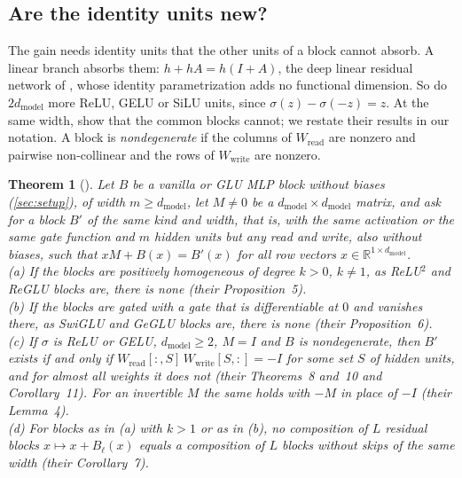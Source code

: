\documentclass[10pt]{article}
\newtheorem{theorem}{Theorem}
\theoremstyle{definition}
\theoremstyle{remark}
\newcommand{\R}{\mathbb{R}}
\newcommand{\Wread}{W_{\mathrm{read}}}
\newcommand{\Wwrite}{W_{\mathrm{write}}}
\newcommand{\dm}{d_{\mathrm{model}}}
\begin{document}
\subsection{Are the identity units new?}\label{sec:oneblock}

The gain needs identity units that the other units of a block cannot absorb. A linear branch absorbs them: $h + hA = h(I + A)$, the deep linear residual network of \citet{hardt2017identity}, whose identity parametrization adds no functional dimension. So do $2\dm$ more ReLU, GELU or SiLU units, since $\sigma(z) - \sigma(-z) = z$. At the same width, \citet{mijoski2026absorb} show that the common blocks cannot; we restate their results in our notation. A block is \emph{nondegenerate} if the columns of $\Wread$ are nonzero and pairwise non-collinear and the rows of $\Wwrite$ are nonzero.

\begin{theorem}[{\citealp{mijoski2026absorb}}]\label{thm:noabsorb}
Let $B$ be a vanilla or GLU MLP block without biases (\cref{sec:setup}), of width $m \ge \dm$, let $M \neq 0$ be a $\dm \times \dm$ matrix, and ask for a block $B'$ of the same kind and width, that is, with the same activation or the same gate function and $m$ hidden units but any read and write, also without biases, such that $xM + B(x) = B'(x)$ for all row vectors $x \in \R^{1\times \dm}$.\\
\textup{(a)} If the blocks are positively homogeneous of degree $k > 0$, $k \neq 1$, as ReLU$^2$ and ReGLU blocks are, there is none (their Proposition~5).\\
\textup{(b)} If the blocks are gated with a gate that is differentiable at $0$ and vanishes there, as SwiGLU and GeGLU blocks are, there is none (their Proposition~6).\\
\textup{(c)} If $\sigma$ is ReLU or GELU, $\dm \ge 2$, $M = I$ and $B$ is nondegenerate, then $B'$ exists if and only if $\Wread[{:},S]\,\Wwrite[S,{:}] = -I$ for some set $S$ of hidden units, and for almost all weights it does not (their Theorems~8 and~10 and Corollary~11). For an invertible $M$ the same holds with $-M$ in place of $-I$ (their Lemma~4).\\
\textup{(d)} For blocks as in (a) with $k > 1$ or as in (b), no composition of $L$ residual blocks $x \mapsto x + B_\ell(x)$ equals a composition of $L$ blocks without skips of the same width (their Corollary~7).
\end{theorem}
\end{document}
